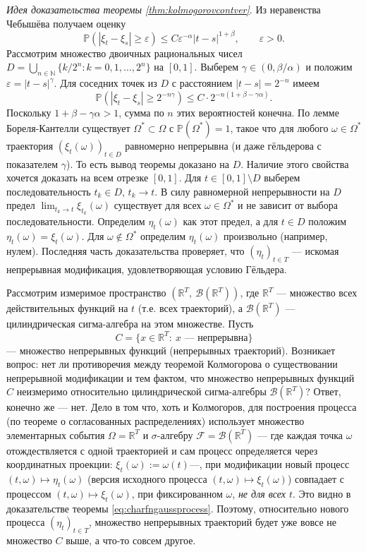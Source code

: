 \documentclass[10pt]{article}
\theoremstyle{boldnormal}
\newcommand{\R}{{\ensuremath{\mathbb{R}}}}
\theoremstyle{boldremark}
\newenvironment{remark}
  {\pushQED{\qed}\renewcommand{\qedsymbol}{$\diamond$}\rem}
  {\popQED\endrem}
\begin{document}
\textit{Идея доказательства теоремы \ref{thm:kolmogorovcontver}}. 
Из неравенства Чебышёва получаем оценку
\[
\mathbb{P}(|\xi_t-\xi_s|\ge \varepsilon)\le C\varepsilon^{-\alpha}|t-s|^{1+\beta},\qquad \varepsilon>0.
\]
Рассмотрим множество двоичных рациональных чисел 
$D=\bigcup_{n\in\mathbb{N}}\{k/2^n: k=0,1,\ldots,2^n\}$ на $[0,1]$.
Выберем $\gamma\in(0,\beta/\alpha)$ и положим $\varepsilon=|t-s|^\gamma$.
Для соседних точек из $D$ с расстоянием $|t-s|=2^{-n}$ имеем
\[
\mathbb{P}(|\xi_t-\xi_s|\ge 2^{-n\gamma})\le C\cdot 2^{-n(1+\beta-\gamma\alpha)}.
\]
Поскольку $1+\beta-\gamma\alpha>1$, сумма по $n$ этих вероятностей конечна.
По лемме Бореля-Кантелли существует $\Omega^*\subset\Omega$ с $\mathbb{P}(\Omega^*)=1$,
такое что для любого $\omega\in\Omega^*$ траектория $(\xi_t(\omega))_{t\in D}$
равномерно непрерывна (и даже гёльдерова с показателем $\gamma$). То есть вывод теоремы доказано на $D$. Наличие этого свойства хочется доказать на всем отрезке $[0,1]$. Для $t\in[0,1]\setminus D$ выберем последовательность $t_k\in D$, $t_k\to t$.
В силу равномерной непрерывности на $D$ предел $\lim_{t_k\to t}\xi_{t_k}(\omega)$
существует для всех $\omega\in\Omega^*$ и не зависит от выбора последовательности.
Определим $\eta_t(\omega)$ как этот предел, а для $t\in D$ положим $\eta_t(\omega)=\xi_t(\omega)$.
Для $\omega\notin\Omega^*$ определим $\eta_t(\omega)$ произвольно (например, нулем).
Последняя часть доказательства проверяет, что $(\eta_t)_{t\in T}$ --- искомая непрерывная модификация, удовлетворяющая условию Гёльдера.


\begin{remark}\label{remark:whynocontrd}
Рассмотрим измеримое пространство $(\mathbb{R}^T,\ \mathcal{B}(\mathbb{R}^T))$, где $\mathbb{R}^T$ — множество всех действительных функций на $t$ (т.е. всех траекторий), а $\mathcal{B}(\mathbb{R}^T)$ — цилиндрическая сигма-алгебра на этом множестве.
Пусть 
\[
C=\{x \in \mathbb{R}^T:\ x \text{ --- непрерывна}\}
\]
— множество непрерывных функций (непрерывных траекторий).
Возникает вопрос: нет ли противоречия между теоремой Колмогорова о существовании
непрерывной модификации и тем фактом, что множество непрерывных функций $C$
неизмеримо относительно цилиндрической сигма-алгебры $\mathcal{B}(\mathbb{R}^T)$?
Ответ, конечно же --- нет. Дело в том что, хоть и Колмогоров, для построения 
процесса (по теореме о согласованных распределениях) использует 
множество элементарных события \(\Omega = \R^T\)
и \(\sigma\)-алгебру \(\mathscr{F}=\mathcal{B}(\R^T)\) ---
где каждая точка \(\omega\) отождествляется с одной траекторией
и сам процесс определяется через координатных проекции: 
\(\xi_t(\omega):=\omega(t)\)---, при модификации новый процесс \((t,\omega)\mapsto \eta_t(\omega)\)
(версия исходного процесса \((t,\omega)\mapsto \xi_t(\omega)\))
совпадает с процессом \((t,\omega)\mapsto \xi_t(\omega)\),
при фиксированном \(\omega\), \emph{не для всех \(t\)}. Это видно в доказательстве 
теоремы \ref{eq:charfngaussprocess}. Поэтому, относительно нового процесса \((\eta_t)_{t\in T}\),
множество непрерывных траекторий будет уже вовсе не множество \(C\) выше, а что-то совсем 
другое.
\end{remark}
\end{document}
